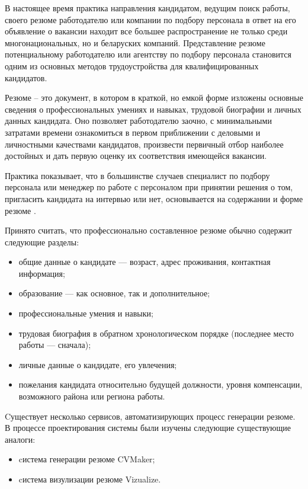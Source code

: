 В настоящее время практика направления кандидатом, ведущим поиск работы, своего резюме работодателю или компании по
подбору персонала в ответ на его объявление о вакансии находит все большее распространение не только среди
многонациональных, но и беларуских компаний. Представление резюме потенциальному работодателю или агентству по подбору
персонала становится одним из основных методов трудоустройства для квалифицированных кандидатов.

Резюме -- это документ, в котором в краткой, но емкой форме изложены основные сведения о профессиональных умениях и
навыках, трудовой биографии и личных данных кандидата. Оно позволяет работодателю заочно, с минимальными затратами
времени ознакомиться в первом приближении с деловыми и личностными качествами кандидатов, произвести первичный отбор
наиболее достойных и дать первую оценку их соответствия имеющейся вакансии.

Практика показывает, что в большинстве случаев специалист по подбору персонала или менеджер по работе с персоналом при
принятии решения о том, пригласить кандидата на интервью или нет, основывается на содержании и форме резюме \cite{cv}.

Принято считать, что профессионально составленное резюме обычно содержит следующие разделы:
\begin{itemize}
	\item общие данные о кандидате — возраст, адрес проживания, контактная информация;
	\item образование — как основное, так и дополнительное;
	\item профессиональные умения и навыки;
	\item трудовая биография в обратном хронологическом порядке (последнее место работы — сначала);
	\item личные данные о кандидате, его увлечения;
	\item пожелания кандидата относительно будущей должности, уровня компенсации, возможного района или региона работы.
\end{itemize}

Cуществует несколько сервисов, автоматизирующих процесс генерации резюме. В процессе проектирования
системы были изучены следующие существующие аналоги:
\begin{itemize}
	\item cистема генерации резюме CVMaker;
	\item cистема визулизации резюме Vizualize.
\end{itemize}

